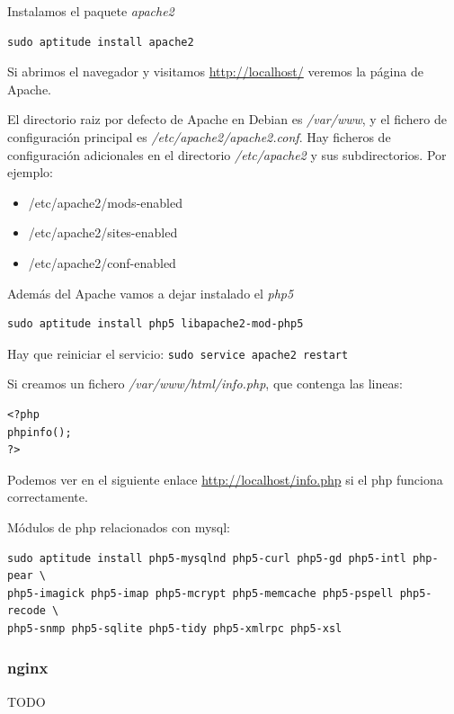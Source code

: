 \documentclass[12pt,spanish,]{article}
\providecommand{\tightlist}{%
  \setlength{\itemsep}{0pt}\setlength{\parskip}{0pt}}
\begin{document}
Instalamos el paquete \emph{apache2}

\begin{verbatim}
sudo aptitude install apache2
\end{verbatim}

Si abrimos el navegador y visitamos \url{http://localhost/} veremos la
página de Apache.

El directorio raiz por defecto de Apache en Debian es \emph{/var/www}, y
el fichero de configuración principal es
\emph{/etc/apache2/apache2.conf}. Hay ficheros de configuración
adicionales en el directorio \emph{/etc/apache2} y sus subdirectorios.
Por ejemplo:

\begin{itemize}
\tightlist
\item
  /etc/apache2/mods-enabled
\item
  /etc/apache2/sites-enabled
\item
  /etc/apache2/conf-enabled
\end{itemize}

Además del Apache vamos a dejar instalado el \emph{php5}

\begin{verbatim}
sudo aptitude install php5 libapache2-mod-php5
\end{verbatim}

Hay que reiniciar el servicio: \texttt{sudo\ service\ apache2\ restart}

Si creamos un fichero \emph{/var/www/html/info.php}, que contenga las
lineas:

\begin{verbatim}
<?php
phpinfo();
?>
\end{verbatim}

Podemos ver en el siguiente enlace \url{http://localhost/info.php} si el
php funciona correctamente.

Módulos de php relacionados con mysql:

\begin{verbatim}
sudo aptitude install php5-mysqlnd php5-curl php5-gd php5-intl php-pear \
php5-imagick php5-imap php5-mcrypt php5-memcache php5-pspell php5-recode \
php5-snmp php5-sqlite php5-tidy php5-xmlrpc php5-xsl
\end{verbatim}

\subsubsection{nginx}\label{nginx}

TODO
\end{document}
